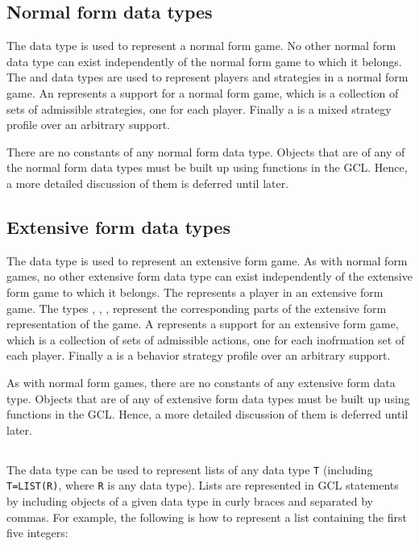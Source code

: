 \subsection{Normal form data types}

The data type  is used to represent a normal form game.  No
other normal form data type can exist independently of the normal form
game to which it belongs.  The  and 
data types are used to represent players and strategies in a normal
form game.  An  represents a support for a normal form
game, which is a collection of sets of admissible strategies, one for
each player.  Finally a  is a mixed strategy profile over
an arbitrary support.

There are no constants of any normal form data type.  Objects that are
of any of the normal form data types must be built up using functions
in the GCL.  Hence, a more detailed discussion of them is deferred
until later.  

\subsection{Extensive form data types}

The data type  is used to represent an extensive form game.  As
with normal form games, no other extensive form data type can exist
independently of the extensive form game to which it belongs.  The
 represents a player in an extensive form game.  The
types , , , 
represent the corresponding parts of the extensive form representation
of the game.  A  represents a support for an extensive
form game, which is a collection of sets of admissible actions, one
for each inofrmation set of each player.  Finally a  is a
behavior strategy profile over an arbitrary support.

As with normal form games, there are no constants of any extensive form
data type.  Objects that are of any of extensive form data types must
be built up using functions in the GCL.  Hence, a more detailed
discussion of them is deferred until later.

\subsection{}

The  data type can be used to represent lists of any
data type \verb+T+ (including \verb+T=LIST(R)+, where \verb+R+ is any
data type).  Lists are represented in GCL statements by including
objects of a given data type in curly braces and separated by commas.
For example, the following is how to represent a list containing the
first five integers:

